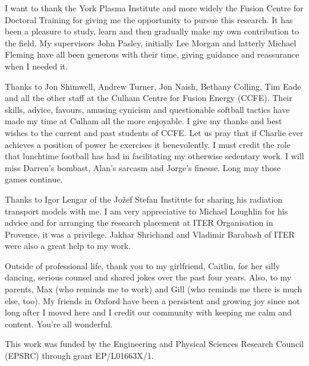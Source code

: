 
\begin{acknowledgements}      
I want to thank the York Plasma Institute and more widely the Fusion Centre for Doctoral Training for giving me the opportunity to pursue this research. It has been a pleasure to study, learn and then gradually make my own contribution to the field. My supervisors John Pasley, initially Lee Morgan and latterly Michael Fleming have all been generous with their time, giving guidance and reassurance when I needed it. 

Thanks to Jon Shimwell, Andrew Turner, Jon Naish, Bethany Colling, Tim Eade and all the other staff at the Culham Centre for Fusion Energy (CCFE). Their skills, advice, favours, amusing cynicism and questionable softball tactics have made my time at Culham all the more enjoyable. I give my thanks and best wishes to the current and past students of CCFE. Let us pray that if Charlie ever achieves a position of power he exercises it benevolently. I must credit the role that lunchtime football has had in facilitating my otherwise sedentary work. I will miss Darren's bombast, Alan's sarcasm and Jorge's finesse. Long may those games continue. 

Thanks to Igor Lengar of the Jo\v zef Stefan Institute for sharing his radiation transport models with me. I am very appreciative to Michael Loughlin for his advice and for arranging the research placement at ITER Organisation in Provence, it was a privilege. Jakhar Shrichand and Vladimir Barabash of ITER were also a great help to my work.

Outside of professional life, thank you to my girlfriend, Caitlin, for her silly dancing, serious counsel and shared jokes over the past four years. Also, to my parents, Max (who reminds me to work) and Gill (who reminds me there is much else, too). My friends in Oxford have been a persistent and growing joy since not long after I moved here and I credit our community with keeping me calm and content. You're all wonderful.

This work was funded by the Engineering and Physical Sciences Research Council (EPSRC) through grant EP/L01663X/1.
\end{acknowledgements}
